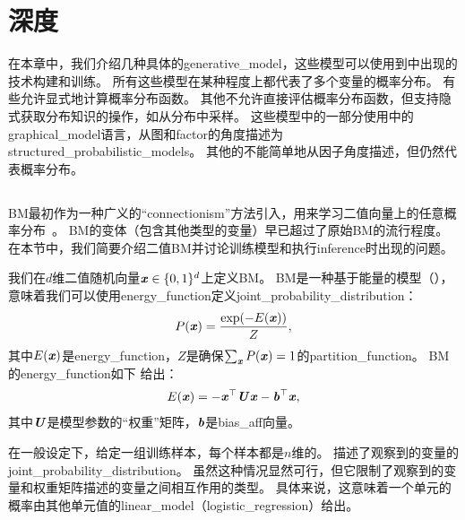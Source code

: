 \chapter{深度}
\label{chap:deep_generative_models}
在本章中，我们介绍几种具体的\gls{generative_model}，这些模型可以使用到中出现的技术构建和训练。
所有这些模型在某种程度上都代表了多个变量的概率分布。
有些允许显式地计算概率分布函数。
其他不允许直接评估概率分布函数，但支持隐式获取分布知识的操作，如从分布中采样。
这些模型中的一部分使用中的\gls{graphical_model}语言，从图和\gls{factor}的角度描述为\gls{structured_probabilistic_models}。
其他的不能简单地从因子角度描述，但仍然代表概率分布。


\section{}
\label{sec:boltzmann_machines}
\gls{BM}最初作为一种广义的``\gls{connectionism}''方法引入，用来学习二值向量上的任意概率分布~\citep{Fahlman83,Ackley85,Hinton-Boltzmann,Hinton86a}。
\gls{BM}的变体（包含其他类型的变量）早已超过了原始\gls{BM}的流行程度。
在本节中，我们简要介绍二值\gls{BM}并讨论训练模型和执行\gls{inference}时出现的问题。

我们在$d$维二值随机向量$\boldsymbol{\mathit{x}} \in \{0, 1\}^d$上定义\gls{BM}。
\gls{BM}是一种基于能量的模型（），意味着我们可以使用\gls{energy_function}定义\gls{joint_probability_distribution}：
\begin{align}\label{eq:201px}
 P(\boldsymbol{\mathit{x}}) = \frac{\exp(-E(\boldsymbol{\mathit{x}}))}{Z},
\end{align}
其中$E(\boldsymbol{\mathit{x}})$是\gls{energy_function}，$Z$是确保$\sum_{\boldsymbol{\mathit{x}}} P(\boldsymbol{\mathit{x}})=1$的\gls{partition_function}。
\gls{BM}的\gls{energy_function}如下
给出：
\begin{align}\label{eq:202E}
 E(\boldsymbol{\mathit{x}}) = -\boldsymbol{\mathit{x}}^\top \boldsymbol{\mathit{U}} \boldsymbol{\mathit{x}} - \boldsymbol{\mathit{b}}^\top \boldsymbol{\mathit{x}},
\end{align}
其中$\boldsymbol{\mathit{U}}$是模型参数的``权重''矩阵，$\boldsymbol{\mathit{b}}$是\gls{bias_aff}向量。


在一般设定下，给定一组训练样本，每个样本都是$n$维的。
描述了观察到的变量的\gls{joint_probability_distribution}。
虽然这种情况显然可行，但它限制了观察到的变量和权重矩阵描述的变量之间相互作用的类型。
具体来说，这意味着一个单元的概率由其他单元值的\gls{linear_model}（\gls{logistic_regression}）给出。

